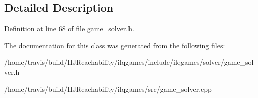 \subsection{Detailed Description}


Definition at line 68 of file game\+\_\+solver.\+h.



The documentation for this class was generated from the following files\+:\begin{DoxyCompactItemize}
\item 
/home/travis/build/\+H\+J\+Reachability/ilqgames/include/ilqgames/solver/game\+\_\+solver.\+h\item 
/home/travis/build/\+H\+J\+Reachability/ilqgames/src/game\+\_\+solver.\+cpp\end{DoxyCompactItemize}
